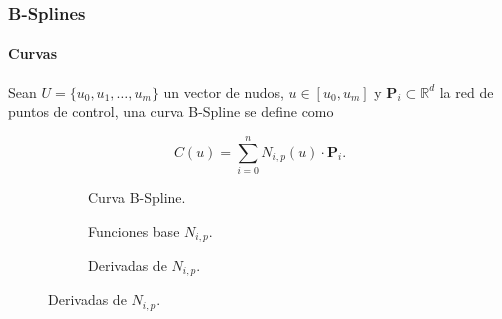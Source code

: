 \documentclass[compress]{beamer}
\begin{document}
\begin{frame}
	\frametitle{B-Splines}
	\framesubtitle{Curvas} 
	\scriptsize
	\begin{definition}
	Sean $U = \{u_0, u_1, \ldots, u_m\}$ un vector de nudos, $u \in [u_0, u_m]$ y $\mathbf{P}_i \subset \mathbb{R}^d$ la red de puntos de control,
		una curva B-Spline se define como		

		\vspace{-0.3cm}
	\begin{equation*}
			C(u) = \sum_{i=0}^{n} N_{i,p}(u) \cdot \mathbf{P}_i.
		\end{equation*}
	\end{definition}
	\begin{figure}[H]
    \centering
	\tiny
    \begin{subfigure}{0.32\textwidth}
        
        \caption{Curva B-Spline.}
        \label{fig:curva_Spline_1}
    \end{subfigure}
    \hfill
    \begin{subfigure}{0.32\textwidth}
        
        \caption{Funciones base $N_{i,p}$.}
        \label{fig:curva_Spline_2}
    \end{subfigure}
    \begin{subfigure}{0.32\textwidth}
        
        \caption{Derivadas de $N_{i,p}$.}
        \label{fig:curva_Spline_3}
    \end{subfigure}
\end{figure}

\end{frame}
\end{document}
